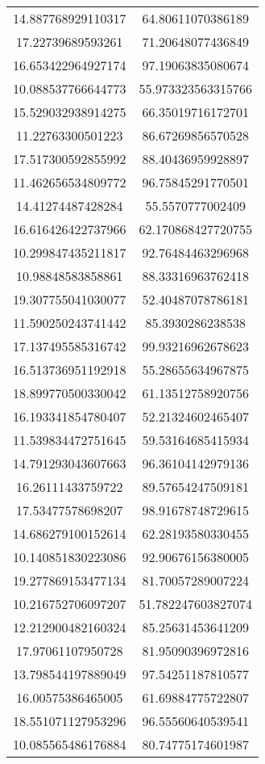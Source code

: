 \begin{table}
\begin{tabular}{cc}
14.887768929110317 & 64.80611070386189 \\
17.22739689593261 & 71.20648077436849 \\
16.653422964927174 & 97.19063835080674 \\
10.088537766644773 & 55.973323563315766 \\
15.529032938914275 & 66.35019716172701 \\
11.22763300501223 & 86.67269856570528 \\
17.517300592855992 & 88.40436959928897 \\
11.462656534809772 & 96.75845291770501 \\
14.41274487428284 & 55.5570777002409 \\
16.616426422737966 & 62.170868427720755 \\
10.299847435211817 & 92.76484463296968 \\
10.98848583858861 & 88.33316963762418 \\
19.307755041030077 & 52.40487078786181 \\
11.590250243741442 & 85.3930286238538 \\
17.137495585316742 & 99.93216962678623 \\
16.513736951192918 & 55.28655634967875 \\
18.899770500330042 & 61.13512758920756 \\
16.193341854780407 & 52.21324602465407 \\
11.539834472751645 & 59.53164685415934 \\
14.791293043607663 & 96.36104142979136 \\
16.26111433759722 & 89.57654247509181 \\
17.53477578698207 & 98.91678748729615 \\
14.686279100152614 & 62.28193580330455 \\
10.140851830223086 & 92.90676156380005 \\
19.277869153477134 & 81.70057289007224 \\
10.216752706097207 & 51.782247603827074 \\
12.212900482160324 & 85.25631453641209 \\
17.97061107950728 & 81.95090396972816 \\
13.798544197889049 & 97.54251187810577 \\
16.00575386465005 & 61.69884775722807 \\
18.551071127953296 & 96.55560640539541 \\
10.085565486176884 & 80.74775174601987 \\

\end{tabular}
\end{table}
